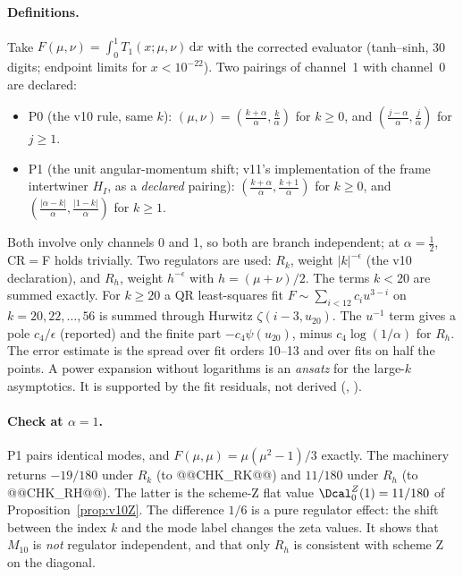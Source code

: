 \paragraph{Definitions.} Take \(F(\mu,\nu)=\int_0^1T_1(x;\mu,\nu)\,\mathrm dx\)
with the corrected evaluator (tanh--sinh, 30 digits; endpoint limits
for \(x<10^{-22}\)). Two pairings of channel~1 with channel~0 are
declared:
\begin{itemize}
\item P0 (the v10 rule, same \(k\)):
\((\mu,\nu)=(\tfrac{k+\alpha}\alpha,\tfrac k\alpha)\) for
\(k\ge0\), and \((\tfrac{j-\alpha}\alpha,\tfrac j\alpha)\) for
\(j\ge1\).
\item P1 (the unit angular-momentum shift; v11's implementation of
the frame intertwiner \(H_I\), as a \emph{declared} pairing):
\((\tfrac{k+\alpha}\alpha,\tfrac{k+1}\alpha)\) for \(k\ge0\), and
\((\tfrac{|\alpha-k|}\alpha,\tfrac{|1-k|}\alpha)\) for \(k\ge1\).
\end{itemize}
Both involve only channels 0 and 1, so both are branch independent;
at \(\alpha=\tfrac12\), CR\(=\)F holds trivially. Two regulators are
used: \(R_k\), weight \(|k|^{-\epsilon}\) (the v10 declaration),
and \(R_h\), weight \(h^{-\epsilon}\) with \(h=(\mu+\nu)/2\). The
terms \(k<20\) are summed exactly. For \(k\ge20\) a QR least-squares
fit \(F\sim\sum_{i<12}c_iu^{3-i}\) on \(k=20,22,\dots,56\) is summed
through Hurwitz \(\zeta(i-3,u_{20})\). The \(u^{-1}\) term gives a
pole \(c_4/\epsilon\) (reported) and the finite part
\(-c_4\psi(u_{20})\), minus \(c_4\log(1/\alpha)\) for \(R_h\). The
error estimate is the spread over fit orders 10--13 and over fits on
half the points. A power expansion without logarithms is an
\emph{ansatz} for the large-\(k\) asymptotics. It is supported by the
fit residuals, not derived (,
).

\paragraph{Check at \(\alpha=1\).} P1 pairs identical modes, and
\(F(\mu,\mu)=\mu(\mu^2-1)/3\) exactly. The machinery returns
\(-19/180\) under \(R_k\) (to @@CHK_RK@@) and \(11/180\) under \(R_h\)
(to @@CHK_RH@@). The latter is the scheme-Z flat value
\(\Dcal^Z_0(1)=11/180\) of Proposition~\ref{prop:v10Z}. The difference
\(1/6\) is a pure regulator effect: the shift between the index
\(k\) and the mode label changes the zeta values. It shows that
\(M_{10}\) is \emph{not} regulator independent, and that only \(R_h\)
is consistent with scheme Z on the diagonal.


